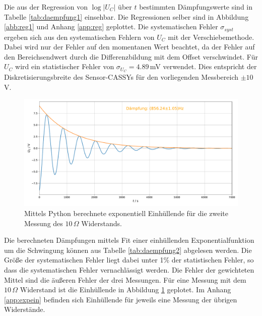\documentclass[a4paper, 12pt]{scrartcl}
\begin{document}
Die aus der Regression von $\log \lvert U_C \rvert$ über $t$ bestimmten Dämpfungswerte sind in Tabelle \ref{tab:daempfung1} einsehbar. Die Regressionen selber sind in Abbildung \ref{abb:reg1} und Anhang \ref{app:reg} geplottet. Die systematischen Fehler $\sigma_{syst}$ ergeben sich aus den systematischen Fehlern von $U_C$ mit der Verschiebemethode. Dabei wird nur der Fehler auf den momentanen Wert beachtet, da der Fehler auf den Bereichsendwert durch die Differenzbildung mit dem Offset verschwindet. Für $U_C$ wird ein statistischer Fehler von $\sigma_{U_C} = 4.89\,$mV verwendet. Dies entspricht der Diskretisierungsbreite des Sensor-CASSYs für den vorliegenden Messbereich $\pm 10\,$V.

\begin{figure}[h]
\centering
\includegraphics[width=\textwidth]{plots/einhuellend/exp_einhuellend3_2.pdf}
\caption{Mittels Python berechnete exponentiell Einhüllende für die zweite Messung des $10\,\Omega$ Widerstands.}
\label{abb:einhuellende1}
\end{figure}

Die berechneten Dämpfungen mittels Fit einer einhüllenden Exponentialfunktion um die Schwingung können aus Tabelle \ref{tab:daempfung2} abgelesen werden. Die Größe der systematischen Fehler liegt dabei unter 1\% der statistischen Fehler, so dass die systematischen Fehler vernachlässigt werden. Die Fehler der gewichteten Mittel sind die äußeren Fehler der drei Messungen. Für eine Messung mit dem $10\,\Omega$ Widerstand ist die Einhüllende in Abbildung \ref{abb:einhuellende1} geplotet. Im Anhang \ref{app:expein} befinden sich Einhüllende für jeweils eine Messung der übrigen Widerstände.
\end{document}
